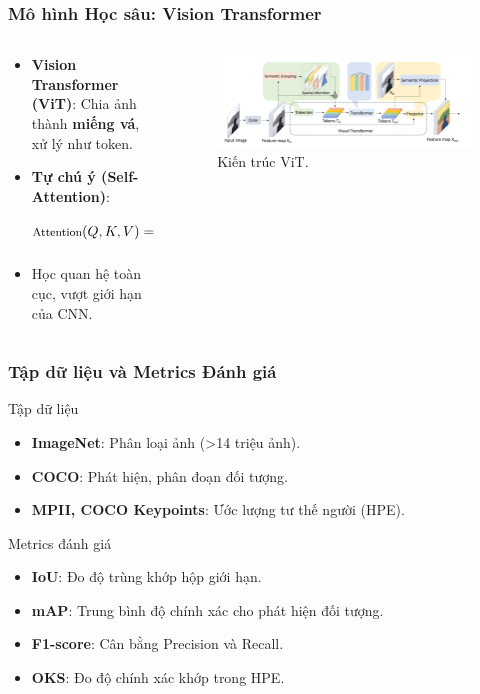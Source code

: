 \begin{frame}
\frametitle{Mô hình Học sâu: Vision Transformer}
\begin{columns}
\begin{column}{0.5\textwidth}
\begin{itemize}
\item \textbf{Vision Transformer (ViT)}: Chia ảnh thành \textbf{miếng vá}, xử lý như token.
\item \textbf{Tự chú ý (Self-Attention)}:
\begin{equation}
\footnotesize
\text{Attention}(Q, K, V) = \text{softmax}\left(\frac{QK^T}{\sqrt{d_k}}\right)V
\end{equation}
\item Học quan hệ toàn cục, vượt giới hạn của CNN.
\end{itemize}
\end{column}

\begin{column}{0.45\textwidth}
\begin{figure}
\centering
\includegraphics[width=\textwidth]{images/visual_transformer.png}
\caption{Kiến trúc ViT.}
\label{fig:vit_arch}
\end{figure}
\end{column}
\end{columns}
\end{frame}

\begin{frame}
\frametitle{Tập dữ liệu và Metrics Đánh giá}
\begin{block}{Tập dữ liệu}
\begin{itemize}
\item \textbf{ImageNet}: Phân loại ảnh (>14 triệu ảnh).
\item \textbf{COCO}: Phát hiện, phân đoạn đối tượng.
\item \textbf{MPII, COCO Keypoints}: Ước lượng tư thế người (HPE).
\end{itemize}
\end{block}

\begin{block}{Metrics đánh giá}
\begin{itemize}
\item \textbf{IoU}: Đo độ trùng khớp hộp giới hạn.
\item \textbf{mAP}: Trung bình độ chính xác cho phát hiện đối tượng.
\item \textbf{F1-score}: Cân bằng Precision và Recall.
\item \textbf{OKS}: Đo độ chính xác khớp trong HPE.
\end{itemize}
\end{block}
\end{frame}
